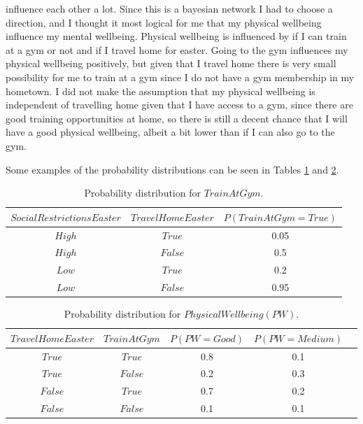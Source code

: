 \documentclass[11pt, a4paper, english]{../Template/NTNUoving}
\begin{document}
\begin{oppgave}
\begin{itemize}
        influence each other a lot. Since this is a bayesian network I had to choose a direction, and I thought it most logical for me that my physical wellbeing influence my mental wellbeing.
        Physical wellbeing is influenced by if I can train at a gym or not and if I travel home for easter. Going to the gym influences my physical wellbeing
        positively, but given that I travel home there is very small possibility for me to train at a gym since I do not have a gym membership in my hometown.
        I did not make the assumption that my physical wellbeing is independent of travelling home given that I have access to a gym, since
        there are good training opportunities at home, so there is still a decent chance that I will have a good physical wellbeing, albeit a bit lower than if I can also go to the gym.
    \end{itemize}

    Some examples of the probability distributions can be seen in Tables \ref{tab:TAG} and \ref{tab:PW}.

    \begin{table}[H]
        \begin{tabular}{|c|c|c|}
            \hline
            $SocialRestrictionsEaster$ & $TravelHomeEaster$ & $P(TrainAtGym=True)$ \\
            \hline
            $High$ & $True$ & 0.05  \\ [1.0ex]
            $High$ & $False$ & 0.5 \\ [1.0ex]
            $Low$ & $True$ & 0.2 \\ [1.0ex]
            $Low$ & $False$ & 0.95 \\ [1.0ex]
            \hline
    \end{tabular}
        \caption{Probability distribution for $TrainAtGym$.}
        \label{tab:TAG}
\end{table}




\begin{table}[H]
    \begin{tabular}{|c|c|c|c|c|}
        \hline
        $TravelHomeEaster$ & $TrainAtGym$ & $P(PW=Good)$ & $P(PW=Medium)$ \\
        \hline
        $True$ & $True$ & 0.8 & 0.1 \\ [1.0ex]
        $True$ & $False$ & 0.2 & 0.3 \\ [1.0ex]
        $False$ & $True$ & 0.7 & 0.2 \\ [1.0ex]
        $False$ & $False$ & 0.1 & 0.1 \\ [1.0ex]
        \hline
    \end{tabular}
    \caption{Probability distribution for $PhysicalWellbeing (PW)$.}
    \label{tab:PW}
\end{table}


\end{oppgave}
\end{document}
